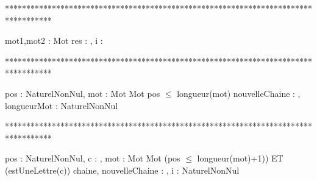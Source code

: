 ***********************************************************************************
\begin{algorithme}
     {mot1,mot2 : Mot}%
     {\booleen}%
     {res : \booleen, i : \entier }%
     {
                  {
                  }%
                  {
                    {
                       {
                       }
                       
                       
                    }
                   }%
      
      }
\end{algorithme}

***********************************************************************************
\begin{algorithme}
       {pos : NaturelNonNul, mot : Mot}
       {Mot}
       {pos $\leq$ longueur(mot)}
       {nouvelleChaine : \chaine, longueurMot : NaturelNonNul}
       {
             {
             }
        }
       
\end{algorithme}

***********************************************************************************
\begin{algorithme}
       {pos : NaturelNonNul, c : \caractere, mot : Mot}%
       {Mot}%
       {(pos $\leq$ longueur(mot)+1)) ET (estUneLettre(c))}%
       {chaine, nouvelleChaine : \chaine, i : NaturelNonNul}
       {
            {
            }

            
       }
\end{algorithme}

